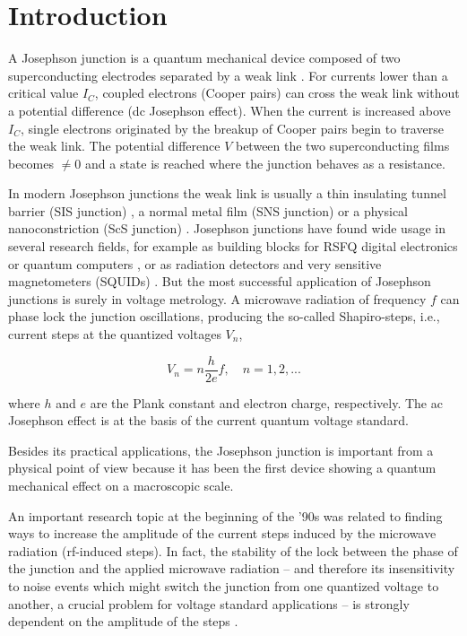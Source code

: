\section{Introduction}


A Josephson junction is a quantum mechanical device composed of two superconducting electrodes separated by a weak link \cite{Barone:1982}.
For currents lower than a critical value $I_C$, coupled electrons (Cooper pairs) can cross the weak link without a potential difference (dc Josephson effect).
When the current is increased above $I_C$, single electrons originated by the breakup of Cooper pairs begin to traverse the weak link. The potential difference $V$ between the two superconducting films becomes $\neq 0$ and a state is reached where the junction behaves as a resistance.

In modern Josephson junctions the weak link is usually a thin insulating tunnel barrier (SIS junction) \cite{Gurvitch:1983}, a normal metal film (SNS junction) \cite{Benz:1995} or a physical nanoconstriction (ScS junction) \cite{Cybart:2015, DeLeo:2016}. Josephson junctions have found wide usage in several research fields, for example as building blocks for RSFQ digital electronics  or quantum computers \cite{Likharev:1991}, or as radiation detectors and very sensitive magnetometers (SQUIDs) \cite{Maggi:2006b, Troeman:2007, Granata:2015}.
But the most successful application of Josephson junctions is surely in voltage metrology.
A microwave radiation of frequency $f$ can phase lock the junction oscillations, producing the so-called Shapiro-steps, i.e., current steps at the quantized voltages $V_n$, 

\begin{equation}
	V_n = n \frac{h}{2 e} f, \quad n = 1, 2, ...
\label{eq:voltage_steps}
\end{equation}

where $h$ and $e$ are the Plank constant and electron charge, respectively. The ac Josephson effect is at the basis of the current quantum voltage standard.

Besides its practical applications, the Josephson junction is important from a physical point of view because it has been the first device showing a quantum mechanical effect on a macroscopic scale.

An important research topic at the beginning of the '90s was related to finding ways to increase the amplitude of the current steps induced by the microwave radiation (rf-induced steps). In fact, the stability of the lock between the phase of the junction and the applied microwave radiation -- and therefore its insensitivity to noise events which might switch the junction from one quantized voltage to another, a crucial problem for voltage standard applications -- is strongly dependent on the amplitude of the steps \cite{Kautz:1987}.

